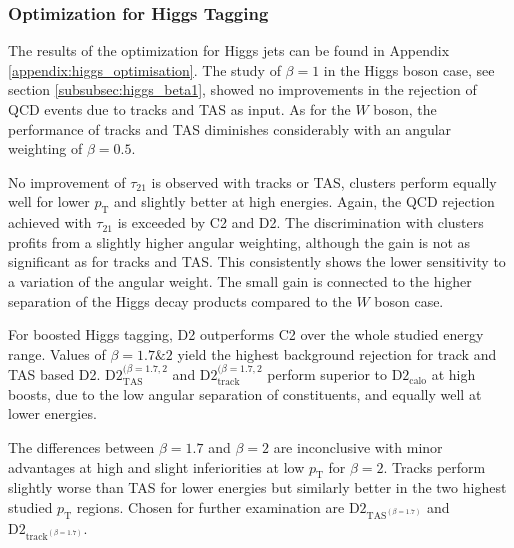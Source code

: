 \subsubsection{Optimization for Higgs Tagging}
The results of the optimization for Higgs jets can be found in Appendix \ref{appendix:higgs_optimisation}. The study of $\beta=1$ in the Higgs boson case, see section \ref{subsubsec:higgs_beta1}, showed no improvements in the rejection of QCD events due to tracks and TAS as input. As for the $W$ boson, the performance of tracks and TAS diminishes considerably with an angular weighting of $\beta=0.5$.

No improvement of $\tau_{21}$ is observed with tracks or TAS, clusters perform equally well for lower $p_{\mathrm{T}}$ and slightly better at high energies. Again, the QCD rejection achieved with $\tau_{21}$ is exceeded by C2 and D2. The discrimination with clusters profits from a slightly higher angular weighting, although the gain is not as significant as for tracks and TAS. This consistently shows the lower sensitivity to a variation of the angular weight. The small gain is connected to the higher separation of the Higgs decay products compared to the $W$ boson case.

For boosted Higgs tagging, D2 outperforms C2 over the whole studied energy range. Values of $\beta=1.7 \& 2$ yield the highest background rejection for track and TAS based D2. $\text{D2}_{\text{TAS}}^{(\beta=1.7,2}$ and $\text{D2}_{\text{track}}^{(\beta=1.7,2}$ perform superior to $\text{D2}_{\text{calo}}$ at high boosts, due to the low angular separation of constituents, and equally well at lower energies.

The differences between $\beta=1.7$ and $\beta=2$ are inconclusive with minor advantages at high and slight inferiorities at low $p_{\mathrm{T}}$ for $\beta=2$. Tracks perform slightly worse than TAS for lower energies but similarly better in the two highest studied $p_{\mathrm{T}}$ regions. Chosen for further examination are $\text{D2}_{\text{TAS}^{(\beta=1.7)}}$ and $\text{D2}_{\text{track}^{(\beta=1.7)}}$.

